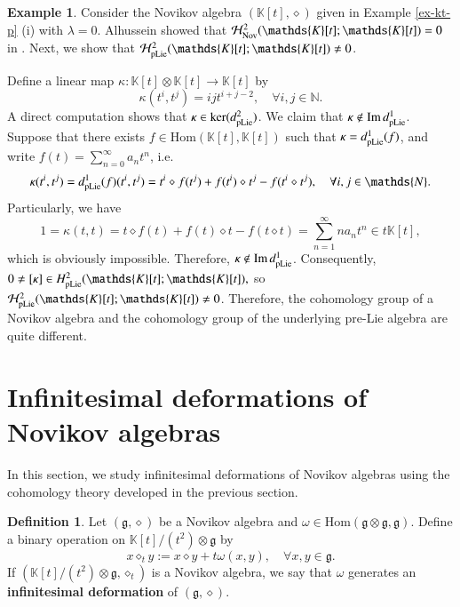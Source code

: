 \documentclass[12pt]{amsart}
\theoremstyle{definition}
\newtheorem{ex}[thm]{Example}
\newtheorem{defi}[thm]{Definition}
\newcommand{\g}{\mathfrak g}
\newcommand{\huaH}{\mathcal{H}}
\newcommand{\Hom}{\mathrm{Hom}}
\newcommand{\ot}{\otimes}
\newcommand{\nov}{{\rm Nov}}
\newcommand{\ome}{\omega}
\newcommand{\pl}{{\rm pLie}}
\begin{document}
\begin{ex}\label{ex:diff}
Consider the Novikov algebra $(\mathds{K}[t],\diamond)$ given in Example \ref{ex-kt-p} (i) with $\lambda =0$.  Alhussein showed that
	$
	\huaH^2_{\nov}(\mathds{K}[t];\mathds{K}[t])=0
	$ in \cite{Alussein}. Next, we show that $ \huaH^2_\pl(\mathds{K}[t];\mathds{K}[t])\neq 0$.

Define a linear map $\kappa:\mathds{K}[t]\otimes\mathds{K}[t]\to\mathds{K}[t]$ by
	$$\kappa(t^i,t^j)=ijt^{i+j-2},\quad\forall i,j\in\mathds{N}.$$
	A direct computation shows that
	$\kappa \in\ker (d^2_\pl)$.
	We claim that $\kappa\notin\operatorname{Im}d^1_\pl$. Suppose that there exists  $f\in\Hom(\mathds{K}[t],\mathds{K}[t])$ such that
	$\kappa=d^1_\pl(f)$, and write $f(t)=\sum\limits_{n=0}^{\infty}a_nt^n$, i.e.
	$$\kappa(t^i,t^j)=d^1_\pl(f)(t^i,t^j)=t^i\diamond f(t^j)+f(t^i)\diamond t^j-f(t^i\diamond t^j),\quad\forall i,j\in\mathds{N}.$$
	Particularly, we have
	$$
	1=\kappa(t,t)=t\diamond f(t)+f(t)\diamond t-f(t\diamond t)=\sum\limits_{n=1}^{\infty}na_nt^n\in t\mathds K[t],
	$$
	which is obviously impossible. Therefore, $\kappa\notin\operatorname{Im}d^1_\pl$. Consequently,
	$
	0\neq[\kappa]\in H^2_\pl(\mathds{K}[t];\mathds{K}[t]),
	$
	so $ \huaH^2_\pl(\mathds{K}[t];\mathds{K}[t])\neq 0$. 	
	Therefore, the cohomology group of a Novikov algebra and the cohomology group of the underlying pre-Lie algebra are quite different.
\end{ex}



\section{Infinitesimal deformations of Novikov algebras}\label{sec:def}

In this section, we study infinitesimal deformations of Novikov algebras using the cohomology theory developed in the previous section.

\begin{defi}
	Let $(\g, \diamond)$ be a Novikov algebra and $\ome \in \Hom(\g\ot\g, \g)$. Define a binary operation on $\mathds{K}[t]/(t^2)\ot\g$ by
	$$
	x\diamond_t y:=x\diamond y+t \ome(x,y),\quad\forall x,y\in\g.
	$$
	If $(\mathds{K}[t]/(t^2)\ot\g, \diamond_t)$ is a Novikov algebra, we say that $\ome$ generates an \textbf{infinitesimal deformation} of $(\g, \diamond)$.
\end{defi}
\end{document}

